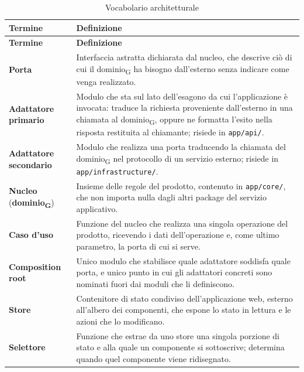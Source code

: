 \documentclass[a4paper, 10pt]{article}
\begin{document}
\begingroup
\small
\setlength{\tabcolsep}{4pt}
\begin{longtable}{|p{3.0cm}|p{11.0cm}|}
    \caption{Vocabolario architetturale}\label{tab:vocabolario-architetturale}\\
    \hline
    \textbf{Termine} & \textbf{Definizione} \\
    \hline
    \endfirsthead
    \hline
    \textbf{Termine} & \textbf{Definizione} \\
    \hline
    \endhead
    \textbf{Porta} & Interfaccia astratta dichiarata dal nucleo, che descrive ciò di cui il dominio\textsubscript{G} ha bisogno dall'esterno senza indicare come venga realizzato. \\ \hline

    \textbf{Adattatore primario} & Modulo che sta sul lato dell'esagono da cui l'applicazione è invocata: traduce la richiesta proveniente dall'esterno in una chiamata al dominio\textsubscript{G}, oppure ne formatta l'esito nella risposta restituita al chiamante; risiede in \texttt{app/api/}. \\ \hline

    \textbf{Adattatore secondario} & Modulo che realizza una porta traducendo la chiamata del dominio\textsubscript{G} nel protocollo di un servizio esterno; risiede in \texttt{app/infrastructure/}. \\ \hline

    \textbf{Nucleo} \newline (\textbf{dominio\textsubscript{G}}) & Insieme delle regole del prodotto, contenuto in \texttt{app/core/}, che non importa nulla dagli altri package del servizio applicativo. \\ \hline

    \textbf{Caso d'uso} & Funzione del nucleo che realizza una singola operazione del prodotto, ricevendo i dati dell'operazione e, come ultimo parametro, la porta di cui si serve. \\ \hline

    \textbf{Composition root} & Unico modulo che stabilisce quale adattatore soddisfa quale porta, e unico punto in cui gli adattatori concreti sono nominati fuori dai moduli che li definiscono. \\ \hline

    \textbf{Store} & Contenitore di stato condiviso dell'applicazione web, esterno all'albero dei componenti, che espone lo stato in lettura e le azioni che lo modificano. \\ \hline

    \textbf{Selettore} & Funzione che estrae da uno store una singola porzione di stato e alla quale un componente si sottoscrive; determina quando quel componente viene ridisegnato. \\ \hline
\end{longtable}
\endgroup
\end{document}
